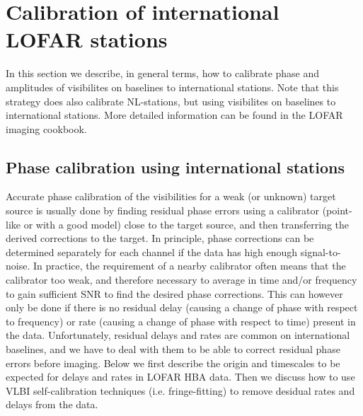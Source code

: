 \documentclass[graybox]{svmult}
\begin{document}
%
%

\section{Calibration of international LOFAR stations}
\label{sect:calibration}
In this section we describe, in general terms, how to calibrate phase
and amplitudes of visibilites on baselines to international stations.
Note that this strategy does also calibrate NL-stations, but using
visibilites on baselines to international stations. 
More detailed information can be found in the LOFAR imaging cookbook.

\subsection{Phase calibration using international stations} 
Accurate phase calibration of the visibilities for a weak (or unknown) target
source is usually done by finding residual phase errors using a calibrator
(point-like or with a good model) close to the target source, and then
transferring the derived corrections to the target.  In principle, phase
corrections can be determined separately for each channel if the data has high
enough signal-to-noise. In practice, the requirement of a nearby calibrator
often means that the calibrator too weak, and therefore necessary to average in
time and/or frequency to gain sufficient SNR to find the desired phase
corrections.  This can however only be done if there is no residual delay
(causing a change of phase with respect to frequency) or rate (causing a change
of phase with respect to time) present in the data.  Unfortunately, residual
delays and rates are common on international baselines, and we have to deal
with them to be able to correct residual phase errors before imaging. Below we
first describe the origin and timescales to be expected for delays and rates in
LOFAR HBA data. Then we discuss how to use VLBI self-calibration techniques
(i.e. fringe-fitting) to remove desidual rates and delays from the data.
\end{document}
